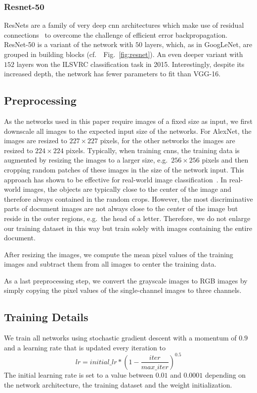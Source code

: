 \documentclass[conference]{IEEEtran}
\newcommand*{\eg}		{e.g.\ }
\newcommand*{\cf}		{cf.\ }
\begin{document}
\subsubsection{\textbf{Resnet-50}}
ResNets are a family of very deep \ac{cnn} architectures which make use of residual connections~\cite{he2016deep} to overcome the challenge of efficient error backpropagation. ResNet-50 is a variant of the network with $50$ layers, which, as in GoogLeNet, are grouped in building blocks (\cf~Fig.~\ref{fig:resnet}). An even deeper variant with $152$ layers won the ILSVRC classification task in 2015. Interestingly, despite its increased depth, the network has fewer parameters to fit than VGG-16.




\subsection{Preprocessing}

As the networks used in this paper require images of a fixed size as input, we first downscale all images to the expected input size of the networks. For AlexNet, the images are resized to $227\times227$ pixels, for the other networks the images are resized to $224\times224$ pixels.
Typically, when training \ac{cnn}s, the training data is augmented by resizing the images to a larger size, \eg $256\times256$ pixels and then cropping random patches of these images in the size of the network input. This approach has shown to be effective for real-world image classification~\cite{cnn_alexnet_nips2014}. In real-world images, the objects are typically close to the center of the image and therefore always contained in the random crops. However, the most discriminative parts of document images are not always close to the center of the image but reside in the outer regions, \eg the head of a letter. Therefore, we do not enlarge our training dataset in this way but train solely with images containing the entire document.

After resizing the images, we compute the mean pixel values of the training images and subtract them from all images to center the training data.

As a last preprocessing step, we convert the grayscale images to RGB images by simply copying the pixel values of the single-channel images to three channels.




\subsection{Training Details}
We train all networks using stochastic gradient descent with a momentum of $0.9$ and a learning rate that is updated every iteration to
\begin{equation}
    lr = initial\_lr * \left( 1 - \frac{iter}{max\_iter}\right) ^ {0.5}
\end{equation}
The initial learning rate is set to a value between $0.01$ and $0.0001$ depending on the network architecture, the training dataset and the weight initialization.
\end{document}
